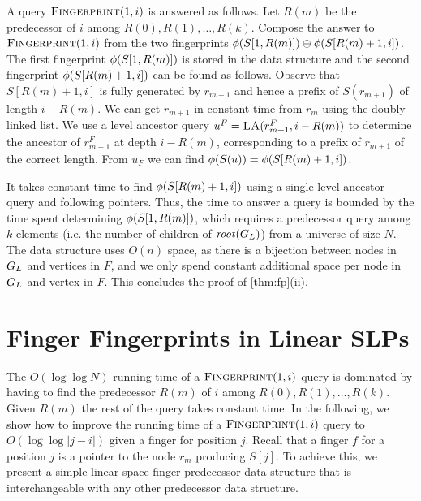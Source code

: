 A query $\textsc{Fingerprint}(1, i)$ is answered as follows. Let $R(m)$ be the predecessor of $i$ among $R(0), R(1), \ldots, R(k)$. Compose the answer to $\textsc{Fingerprint}(1, i)$ from the two fingerprints $\phi(S[1, R(m)])\oplus\phi(S[R(m)+1, i])$. The first fingerprint $\phi(S[1, R(m)])$ is stored in the data structure and the second fingerprint $\phi(S[R(m)+1, i])$ can be found as follows. Observe that $S[R(m)+1, i]$ is fully generated by $r_{m+1}$ and hence a prefix of $S(r_{m+1})$ of length $i-R(m)$. We can get $r_{m+1}$ in constant time from $r_m$ using the doubly linked list. We use a level ancestor query $u^F = \textsc{LA}(r_{m+1}^F, i-R(m))$ to determine the ancestor of $r_{m+1}^F$ at depth $i-R(m)$, corresponding to a prefix of $r_{m+1}$ of the correct length. From $u_F$ we can find $\phi(S(u)) = \phi(S[R(m)+1, i])$.

It takes constant time to find $\phi(S[R(m)+1, i])$ using a single level ancestor query and following pointers. Thus, the time to answer a query is bounded by the time spent determining $\phi(S[1, R(m)])$, which requires a predecessor query among $k$ elements (i.e. the number of children of $\mathit{root}(G_L)$) from a universe of size $N$. The data structure uses $O(n)$ space, as there is a bijection between nodes in $G_L$ and vertices in $F$, and we only spend constant additional space per node in $G_L$ and vertex in $F$. This concludes the proof of \autoref{thm:fp}(ii).


\section{Finger Fingerprints in Linear SLPs}
The $O(\log\log N)$ running time of a $\textsc{Fingerprint}(1, i)$ query is dominated by having to find the predecessor $R(m)$ of $i$ among $R(0), R(1), \ldots, R(k)$. Given $R(m)$ the rest of the query takes constant time. In the following, we show how to improve the running time of a $\textsc{Fingerprint}(1, i)$ query to $O(\log \log |j-i|)$ given a finger for position $j$.  %
Recall that a finger $f$ for  a position $j$ is a pointer to the node $r_m$ producing $S[j]$.
To achieve this, we present a simple linear space finger predecessor data structure that is interchangeable with any other predecessor data structure.

